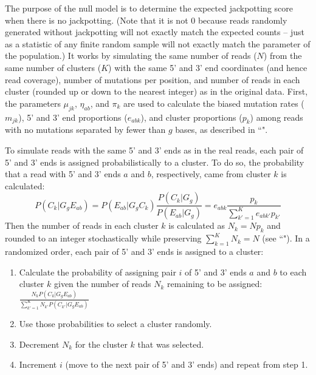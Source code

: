 \documentclass[11pt]{article}
\begin{document}
The purpose of the null model is to determine the expected jackpotting score when there is no jackpotting.
(Note that it is not 0 because reads randomly generated without jackpotting will not exactly match the expected counts -- just as a statistic of any finite random sample will not exactly match the parameter of the population.)
It works by simulating the same number of reads ($N$) from the same number of clusters ($K$) with the same 5' and 3' end coordinates (and hence read coverage), number of mutations per position, and number of reads in each cluster (rounded up or down to the nearest integer) as in the original data.
First, the parameters $\mu_{jk}$, $\eta_{ab}$, and $\pi_k$ are used to calculate the biased mutation rates ($m_{jk}$), 5' and 3' end proportions ($e_{abk}$), and cluster proportions ($p_k$) among reads with no mutations separated by fewer than $g$ bases, as described in ``".

To simulate reads with the same 5' and 3' ends as in the real reads, each pair of 5' and 3' ends is assigned probabilistically to a cluster.
To do so, the probability that a read with 5' and 3' ends $a$ and $b$, respectively, came from cluster $k$ is calculated:
$$P(C_k | G_g E_{ab}) = P(E_{ab} | G_g C_k) \frac{P(C_k | G_g)}{P(E_{ab} | G_g)} = e_{abk}\frac{p_k}{\sum_{k'=1}^K{e_{abk'}p_{k'}}}$$
Then the number of reads in each cluster $k$ is calculated as $N_k = Np_k$ and rounded to an integer stochastically while preserving $\sum_{k=1}^{K}N_k = N$ (see ``").
In a randomized order, each pair of 5' and 3' ends is assigned to a cluster:
\begin{enumerate}
    \item Calculate the probability of assigning pair $i$ of 5' and 3' ends $a$ and $b$ to each cluster $k$ given the number of reads $N_k$ remaining to be assigned: $\frac{N_k P(C_k | G_g E_{ab})}{\sum_{k'=1}^K{N_{k'} P(C_{k'} | G_g E_{ab})}}$
    \item Use those probabilities to select a cluster randomly.
    \item Decrement $N_k$ for the cluster $k$ that was selected.
    \item Increment $i$ (move to the next pair of 5' and 3' ends) and repeat from step 1.
\end{enumerate}
\end{document}
